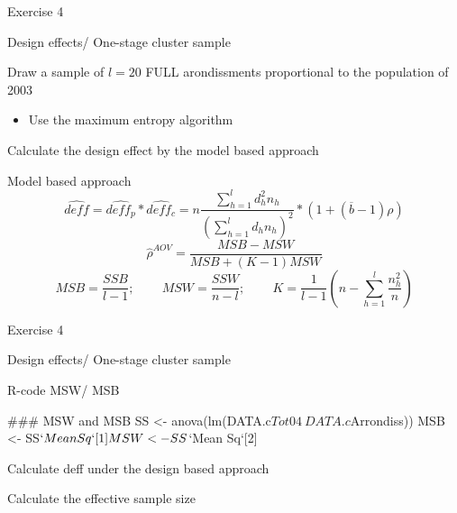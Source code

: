 \documentclass[11pt,german,hideothersubsections]{beamer}
\begin{document}
\begin{frame}[fragile]{Exercise 4}
\footnotesize{
\begin{exampleblock}{Design effects/ One-stage cluster sample}
\begin{enumerate}\footnotesize{
\item Draw a sample of $l=20$ FULL arondissments proportional to the population of 2003
\begin{itemize}
\item[$\Rightarrow$] Use the maximum entropy algorithm
\end{itemize}
\item Calculate the design effect by the model based approach
\begin{block}{Model based approach}
\begin{equation*}
\hat{deff}=\hat{deff_p} * \hat{deff_c} = n\frac{\sum_{h=1}^ld_h^2 n_h}{(\sum_{h=1}^ld_h n_h)^2}*(1+(\overline{b}-1)\rho)
\end{equation*}
\begin{equation*}
\hat{\rho}^{AOV}=\frac{MSB-MSW}{MSB+(K-1)MSW}
\end{equation*}
\begin{equation*}
MSB=\frac{SSB}{l-1}\text{;~~~~~~~}MSW=\frac{SSW}{n-l}\text{;~~~~~~~}K=\frac{1}{l-1}(n-\sum_{h=1}^l\frac{n_h^2}{n})
\end{equation*}
\end{block}
}
\end{enumerate}
\end{exampleblock}
}
\end{frame}
\begin{frame}[fragile]{Exercise 4}
\footnotesize{
\begin{exampleblock}{Design effects/ One-stage cluster sample}
\begin{enumerate}\footnotesize{
\begin{block}{R-code MSW/ MSB}
\begin{Schunk}
\begin{Sinput}
 ### MSW and MSB 
 SS <- anova(lm(DATA.c$Tot04~DATA.c$Arrondiss))
 MSB <- SS$`Mean Sq`[1]
 MSW <- SS$`Mean Sq`[2]
\end{Sinput}
\end{Schunk}
\end{block}
\item[3] Calculate deff under the design based approach
\item[4] Calculate the effective sample size}
\end{enumerate}
\end{exampleblock}
}
\end{frame}
\end{document}
